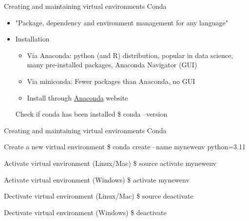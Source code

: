 \documentclass[10pt, aspectratio=169]{beamer}
\newcommand{\cemph}[1]{\textcolor{mzescyan}{#1}}
\newcommand{\gemph}[1]{\textcolor{mzesgold}{#1}}
\begin{document}
{       	\begin{frame}{Creating and maintaining virtual environments}
\small          
 \gemph{Conda}
\begin{itemize}
    \item "Package, dependency and environment management for any language"
    \item Installation
    \begin{itemize}
        \item Via \cemph{Anaconda}: python (and R) distribution, popular in data science, many pre-installed packages, Anaconda Navigator (GUI)
        \item Via \cemph{miniconda}: Fewer packages than Anaconda, no GUI
        \item Install through \href{https://www.anaconda.com}{Anaconda} website
    \end{itemize}
    \begin{block}{Check if conda has been installed}
                   \$ conda --version
		          \end{block} 
\end{itemize}
  \end{frame}





       	\begin{frame}{Creating and maintaining virtual environments}
\small          
 \gemph{Conda}
 \begin{block}{Create a new virtual environment}
                   \$ conda create --name mynewenv python=3.11

		          \end{block} 
            
                 \begin{block}{Activate virtual environment (Linux/Mac)}
                   \$ source activate mynewenv
		          \end{block} \begin{block}{Activate virtual environment (Windows)}
                   \$ activate mynewenv
		          \end{block}
             \begin{block}{Dectivate virtual environment (Linux/Mac)}
                   \$ source deactivate
		          \end{block}
              \begin{block}{Dectivate virtual environment (Windows)}
                   \$ deactivate
		          \end{block}


\end{frame}}
\end{document}
